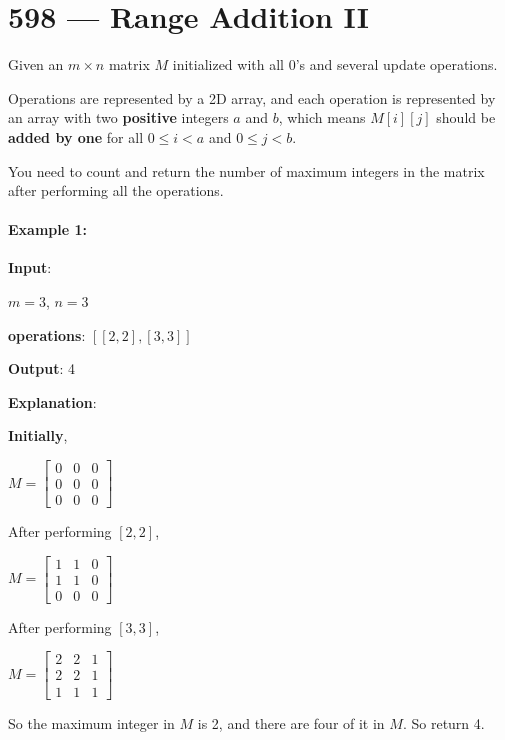 \section{598 --- Range Addition II}
Given an $m \times n$ matrix $M$ initialized with all 0's and several update operations.

Operations are represented by a 2D array, and each operation is represented by an array with two \textbf{positive} integers $a$ and $b$, which means $M[i][j]$ should be \textbf{added by one} for all $0 \leq i < a$ and $0 \leq j < b$.

You need to count and return the number of maximum integers in the matrix after performing all the operations.

\paragraph{Example 1:}

\begin{flushleft}


\textbf{Input}: 

$m = 3$, $n = 3$

\textbf{operations}: $[[2,2],[3,3]]$

\textbf{Output}: 4

\textbf{Explanation}:
 
\textbf{Initially},

$ M = \begin{bmatrix}
0 & 0  & 0 \\
0 & 0 & 0 \\
0 & 0 & 0
\end{bmatrix}$

After performing $[2,2]$, 

$ M = \begin{bmatrix}
1 & 1  & 0 \\
1 & 1 & 0 \\
0 & 0 & 0
\end{bmatrix}$

After performing $[3,3]$,

$ M = \begin{bmatrix}
2 & 2  & 1 \\
2 & 2 & 1 \\
1 & 1 & 1
\end{bmatrix}$

So the maximum integer in $M$ is 2, and there are four of it in $M$. So return 4.

\end{flushleft}

